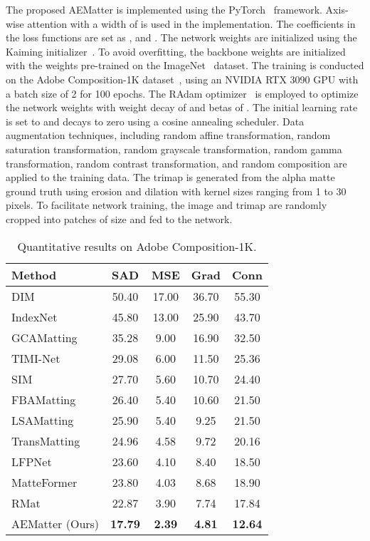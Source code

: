 \documentclass[10pt,twocolumn,letterpaper]{article}
\begin{document}
The proposed AEMatter is implemented using the PyTorch~\cite{NEURIPS2019_9015} framework.
Axis-wise attention with a width of  is used in the implementation. 
The coefficients in the loss functions are set as , and .
The network weights are initialized using the Kaiming initializer~\cite{he2015delving}. 
To avoid overfitting, the backbone weights are initialized with the weights pre-trained on the ImageNet~\cite{deng2009imagenet} dataset.
The training is conducted on the Adobe Composition-1K dataset~\cite{xu2017deep}, using an NVIDIA RTX 3090 GPU with a batch size of 2 for 100 epochs. 
The RAdam optimizer~\cite{liu2019radam} is employed to optimize the network weights with weight decay of  and betas of .
The initial learning rate is set to  and decays to zero using a cosine annealing scheduler.
Data augmentation techniques, including random affine transformation, random saturation transformation, random grayscale transformation, random gamma transformation, random contrast transformation, and random composition are applied to the training data.
The trimap is generated from the alpha matte ground truth using erosion and dilation with kernel sizes ranging from 1 to 30 pixels. 
To facilitate network training, the image and trimap are randomly cropped into patches of size  and fed to the network.




\begin{table}[!t]
  \centering
  \caption{Quantitative results on Adobe Composition-1K.
  }
\begin{tabular}{l|c|c|c|c}
        \toprule
    Method & {SAD} & {MSE} & {Grad} & {Conn} \\
    \midrule
    DIM~\cite{xu2017deep} &50.40  & 17.00  & 36.70  & 55.30  \\
    IndexNet~\cite{lu2019indices}& 45.80  & 13.00  & 25.90  & 43.70   \\
    GCAMatting~\cite{li2020natural} & 35.28  & 9.00  & 16.90  & 32.50  \\
TIMI-Net~\cite{Liu_2021_ICCV}& 29.08  & 6.00  & 11.50  & 25.36   \\
    SIM~\cite{sun2021sim}  &27.70  & 5.60  & 10.70  & 24.40  \\
    FBAMatting~\cite{forte2020fbamatting} & 26.40  & 5.40  & 10.60  & 21.50  \\
    LSAMatting~\cite{lsam} & 25.90  & 5.40  & 9.25  & 21.50  \\
        TransMatting~\cite{cai2022TransMatting}& 24.96 &4.58& 9.72& 20.16  \\
    LFPNet~\cite{liu2021lfpnet} & 23.60  & 4.10  & 8.40  & 18.50    \\
    MatteFormer~\cite{park2022matteformer}& 23.80  & 4.03  & 8.68  &18.90  \\
    RMat~\cite{dai2022boosting} & 22.87  & 3.90  & 7.74  &17.84  \\
        \midrule
    AEMatter (Ours)  &\bf{17.79}&\bf{2.39}&\bf{4.81}&\bf{12.64} \\
        \bottomrule
    \end{tabular}\label{tab:adb}\end{table}
\end{document}

